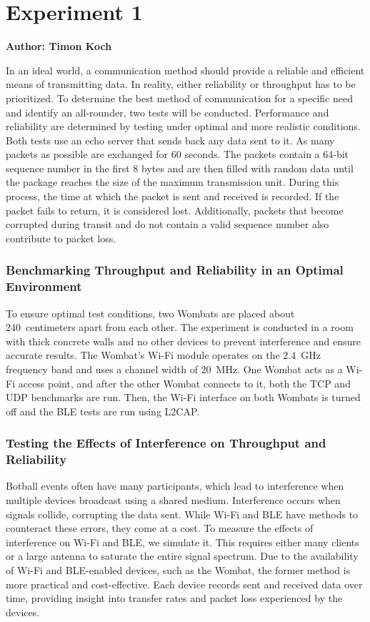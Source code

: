 \chapter{Experiment 1}
\textbf{Author: Timon Koch} 

In an ideal world, a communication method should provide a reliable and efficient means of transmitting data.
In reality, either reliability or throughput has to be prioritized.
To determine the best method of communication for a specific need and identify an all-rounder, two tests will be conducted.
Performance and reliability are determined by testing under optimal and more realistic conditions.
Both tests use an echo server that sends back any data sent to it.
As many packets as possible are exchanged for 60 seconds.
The packets contain a 64-bit sequence number in the first 8 bytes and are then filled with random data until the package reaches the size of the maximum transmission unit.
During this process, the time at which the packet is sent and received is recorded.
If the packet fails to return, it is considered lost.
Additionally, packets that become corrupted during transit and do not contain a valid sequence number also contribute to packet loss.

\subsection{Benchmarking Throughput and Reliability in an Optimal Environment}
To ensure optimal test conditions, two Wombats are placed about 240~centimeters apart from each other.
The experiment is conducted in a room with thick concrete walls and no other devices to prevent interference and ensure accurate results.
The Wombat's Wi-Fi module operates on the 2.4~GHz frequency band and uses a channel width of 20~MHz. One Wombat acts as a Wi-Fi access point, and after the other Wombat connects to it, both the TCP and UDP benchmarks are run.
Then, the Wi-Fi interface on both Wombats is turned off and the BLE tests are run using L2CAP.

\subsection{Testing the Effects of Interference on Throughput and Reliability}
Botball events often have many participants, which lead to interference when multiple devices broadcast using a shared medium.
Interference occurs when signals collide, corrupting the data sent.
While Wi-Fi and BLE have methods to counteract these errors, they come at a cost.
To measure the effects of interference on Wi-Fi and BLE, we simulate it.
This requires either many clients or a large antenna to saturate the entire signal spectrum.
Due to the availability of Wi-Fi and BLE-enabled devices, such as the Wombat, the former method is more practical and cost-effective.
Each device records sent and received data over time, providing insight into transfer rates and packet loss experienced by the devices.

